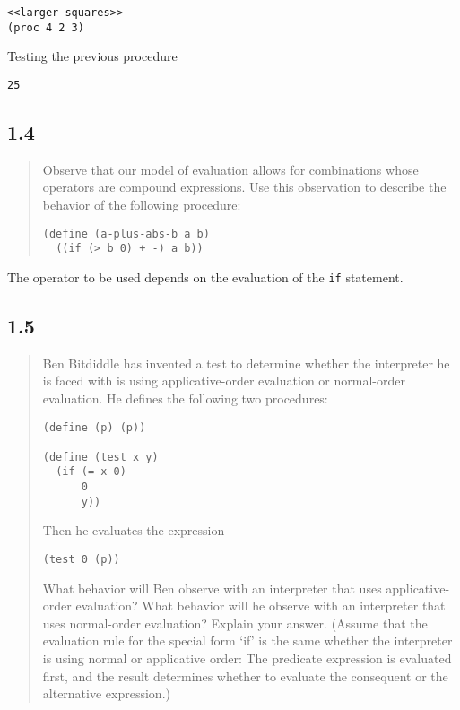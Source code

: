 \documentclass[a4paper, titlepage, twoside]{article}
\begin{document}
\begin{listing}[H]
\begin{verbatim}
<<larger-squares>>
(proc 4 2 3)
\end{verbatim}
\caption{Testing the previous procedure}
\end{listing}

\begin{verbatim}
25
\end{verbatim}

\subsection*{1.4}
\label{sec:org36865bc}

\begin{quote}
Observe that our model of evaluation allows for combinations whose operators are compound expressions. Use this observation to describe the behavior of the following procedure:

\begin{verbatim}
(define (a-plus-abs-b a b)
  ((if (> b 0) + -) a b))
\end{verbatim}
\end{quote}

The operator to be used depends on the evaluation of the \texttt{if} statement.

\subsection*{1.5}
\label{sec:org9417c2e}

\begin{quote}
Ben Bitdiddle has invented a test to determine whether the interpreter he is faced with is using applicative-order evaluation or normal-order evaluation.  He defines the following two procedures:

\begin{verbatim}
(define (p) (p))

(define (test x y)
  (if (= x 0)
      0
      y))
\end{verbatim}

Then he evaluates the expression

\begin{verbatim}
(test 0 (p))
\end{verbatim}

What behavior will Ben observe with an interpreter that uses applicative-order evaluation?  What behavior will he observe with an interpreter that uses normal-order evaluation?  Explain your answer.  (Assume that the evaluation rule for the special form `if' is the same whether the interpreter is using normal or applicative order: The predicate expression is evaluated first, and the result determines whether to evaluate the consequent or the alternative expression.)
\end{quote}
\end{document}
